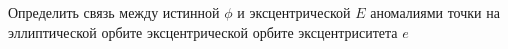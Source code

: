 Определить связь между истинной $\phi$ и эксцентрической $E$ аномалиями 
точки на эллиптической орбите эксцентрической орбите эксцентриситета $e$